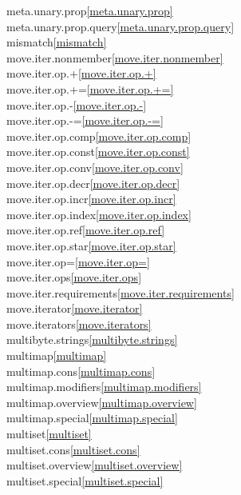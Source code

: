 \begin{multicols}{2}
meta.unary.prop\quad\ref{meta.unary.prop}\\
meta.unary.prop.query\quad\ref{meta.unary.prop.query}\\
mismatch\quad\ref{mismatch}\\
move.iter.nonmember\quad\ref{move.iter.nonmember}\\
move.iter.op.+\quad\ref{move.iter.op.+}\\
move.iter.op.+=\quad\ref{move.iter.op.+=}\\
move.iter.op.-\quad\ref{move.iter.op.-}\\
move.iter.op.-=\quad\ref{move.iter.op.-=}\\
move.iter.op.comp\quad\ref{move.iter.op.comp}\\
move.iter.op.const\quad\ref{move.iter.op.const}\\
move.iter.op.conv\quad\ref{move.iter.op.conv}\\
move.iter.op.decr\quad\ref{move.iter.op.decr}\\
move.iter.op.incr\quad\ref{move.iter.op.incr}\\
move.iter.op.index\quad\ref{move.iter.op.index}\\
move.iter.op.ref\quad\ref{move.iter.op.ref}\\
move.iter.op.star\quad\ref{move.iter.op.star}\\
move.iter.op=\quad\ref{move.iter.op=}\\
move.iter.ops\quad\ref{move.iter.ops}\\
move.iter.requirements\quad\ref{move.iter.requirements}\\
move.iterator\quad\ref{move.iterator}\\
move.iterators\quad\ref{move.iterators}\\
multibyte.strings\quad\ref{multibyte.strings}\\
multimap\quad\ref{multimap}\\
multimap.cons\quad\ref{multimap.cons}\\
multimap.modifiers\quad\ref{multimap.modifiers}\\
multimap.overview\quad\ref{multimap.overview}\\
multimap.special\quad\ref{multimap.special}\\
multiset\quad\ref{multiset}\\
multiset.cons\quad\ref{multiset.cons}\\
multiset.overview\quad\ref{multiset.overview}\\
multiset.special\quad\ref{multiset.special}\\

\end{multicols}
